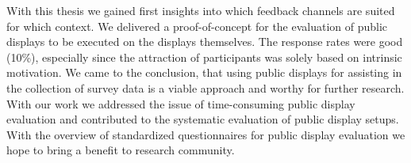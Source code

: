 	With this thesis we gained first insights into which feedback channels are suited for which context. We delivered a proof-of-concept for the evaluation of public displays to be executed on the displays themselves.
	The response rates were good (10\%), especially since the attraction of participants was solely based on intrinsic motivation. We came to the conclusion, that using public displays for assisting in the collection of survey data is a viable approach and worthy for further research.
	With our work we addressed the issue of time-consuming public display evaluation and contributed to the systematic evaluation of public display setups. With the overview of standardized questionnaires for public display evaluation we hope to bring a benefit to research community.







